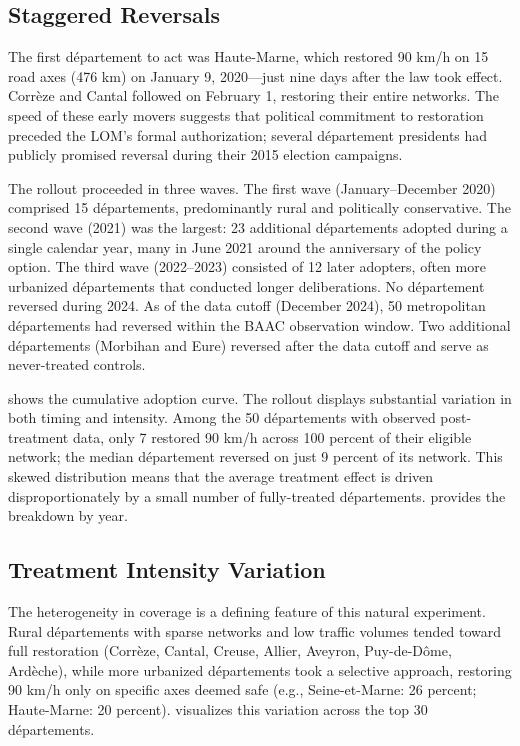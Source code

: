 \documentclass[12pt]{article}
\begin{document}
\subsection{Staggered Reversals}

The first d\'{e}partement to act was Haute-Marne, which restored 90 km/h on 15 road axes (476 km) on January 9, 2020---just nine days after the law took effect. Corr\`{e}ze and Cantal followed on February 1, restoring their entire networks. The speed of these early movers suggests that political commitment to restoration preceded the LOM's formal authorization; several d\'{e}partement presidents had publicly promised reversal during their 2015 election campaigns.

The rollout proceeded in three waves. The first wave (January--December 2020) comprised 15 d\'{e}partements, predominantly rural and politically conservative. The second wave (2021) was the largest: 23 additional d\'{e}partements adopted during a single calendar year, many in June 2021 around the anniversary of the policy option. The third wave (2022--2023) consisted of 12 later adopters, often more urbanized d\'{e}partements that conducted longer deliberations. No d\'{e}partement reversed during 2024. As of the data cutoff (December 2024), 50 metropolitan d\'{e}partements had reversed within the BAAC observation window. Two additional d\'{e}partements (Morbihan and Eure) reversed after the data cutoff and serve as never-treated controls.

 shows the cumulative adoption curve. The rollout displays substantial variation in both timing and intensity. Among the 50 d\'{e}partements with observed post-treatment data, only 7 restored 90 km/h across 100 percent of their eligible network; the median d\'{e}partement reversed on just 9 percent of its network. This skewed distribution means that the average treatment effect is driven disproportionately by a small number of fully-treated d\'{e}partements.  provides the breakdown by year.

\subsection{Treatment Intensity Variation}

The heterogeneity in coverage is a defining feature of this natural experiment. Rural d\'{e}partements with sparse networks and low traffic volumes tended toward full restoration (Corr\`{e}ze, Cantal, Creuse, Allier, Aveyron, Puy-de-D\^{o}me, Ard\`{e}che), while more urbanized d\'{e}partements took a selective approach, restoring 90 km/h only on specific axes deemed safe (e.g., Seine-et-Marne: 26 percent; Haute-Marne: 20 percent).  visualizes this variation across the top 30 d\'{e}partements.
\end{document}
